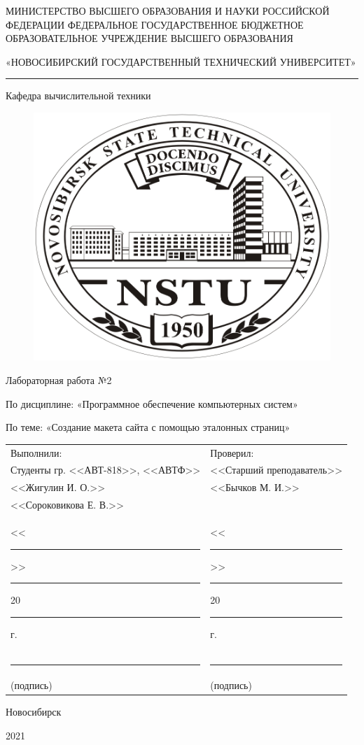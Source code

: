\thispagestyle{empty}
\begin{center}

МИНИСТЕРСТВО ВЫСШЕГО ОБРАЗОВАНИЯ И НАУКИ РОССИЙСКОЙ ФЕДЕРАЦИИ
ФЕДЕРАЛЬНОЕ ГОСУДАРСТВЕННОЕ БЮДЖЕТНОЕ
ОБРАЗОВАТЕЛЬНОЕ УЧРЕЖДЕНИЕ
ВЫСШЕГО ОБРАЗОВАНИЯ

«НОВОСИБИРСКИЙ ГОСУДАРСТВЕННЫЙ ТЕХНИЧЕСКИЙ УНИВЕРСИТЕТ»

\noindent\rule{\textwidth}{0.4pt}

Кафедра вычислительной техники

\begin{figure}[H]
	\centering
	\includegraphics{title/logo.jpeg}
\end{figure}

Лабораторная работа №2

По дисциплине: «Программное обеспечение компьютерных систем»

По теме: «Создание макета сайта с помощью эталонных страниц»

\end{center}

\noindent\begin{tabular}{p{}p{}}
	Выполнили:                                                        & Проверил: \\
	Студенты гр. <<АВТ-818>>, <<АВТФ>>                                & <<Старший преподаватель>>\\
	<<Жигулин И. О.>>                                                 & <<Бычков М. И.>> \\
	<<Сороковикова Е. В.>>                                            & \\
	<<\rule{1.5em}{0.4pt}>> \rule{5em}{0.4pt} 20\rule{1.5em}{0.4pt}г. & <<\rule{1.5em}{0.4pt}>> \rule{5em}{0.4pt} 20\rule{1.5em}{0.4pt}г.\\
	\rule{7.5em}{0.4pt}                                               & \rule{7.5em}{0.4pt} \\
	\hspace{1.5em}(подпись)                                           & \hspace{1.5em}(подпись)
\end{tabular}


\begin{center}

\vspace{2.0cm}

Новосибирск

2021
\end{center}

